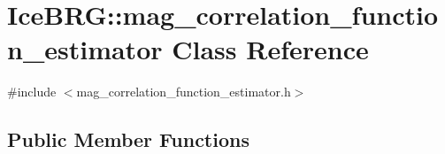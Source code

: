\hypertarget{classIceBRG_1_1mag__correlation__function__estimator}{}\section{Ice\+B\+R\+G\+:\+:mag\+\_\+correlation\+\_\+function\+\_\+estimator Class Reference}
\label{classIceBRG_1_1mag__correlation__function__estimator}


{\ttfamily \#include $<$mag\+\_\+correlation\+\_\+function\+\_\+estimator.\+h$>$}

\subsection*{Public Member Functions}
